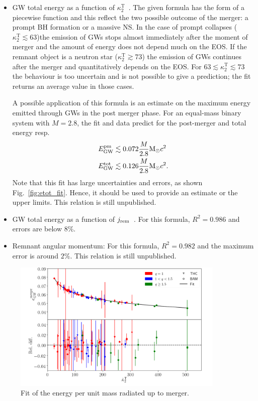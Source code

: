 \documentclass[aps,prl,onecolumn,superscriptaddress,groupedaddress,nofootinbib,floatfix,notitlepage]{revtex4-1}
\newcommand{\stext}[1]{\text{#1}}
\def\Msun{{\rm M_{\odot}}}
\begin{document}
\begin{itemize}
\item GW total energy as a function of $\kappa^\text{T}_2$~\cite{Zappa:2017xba}. The given formula has the form of a piecewise function 
  and this reflect the two possible outcome of the merger: a prompt BH
  formation or a massive NS. 
  In the case of prompt collapses ($\kappa_2^\stext{T} \lesssim 63 $)the emission of GWs stops almost immediately
  after the moment of merger and the amount of energy does not depend much on the EOS. If the remnant object is a neutron star ($\kappa_2^\stext{T} \gtrsim 73 $) the 
  emission of GWs continues after the merger and quantitatively
  depends on the EOS. For $63 \lesssim \kappa_2^\stext{T} \lesssim 73$ the
  behaviour is too uncertain  and is not possible to give a prediction; the fit returns an average value in those cases.

  A possible application of this formula is an estimate on the maximum energy emitted through GWs in the post merger phase. For an equal-mass binary system with $M = 2.8$,
  the fit and data predict for the post-merger and total energy resp.
  \begin{align}
  E_\stext{GW}^\stext{pm} &\lesssim 0.072 \frac{M}{2.8} \Msun c^2 \\
  E_\stext{GW}^\stext{tot} &\lesssim 0.126 \frac{M}{2.8} \Msun c^2.
  \end{align}
  Note that this fit has large uncertainties and errors, as shown Fig.~\ref{fig:etot_fit}. Hence, it should be used to provide an estimate or the upper limits. This relation is still unpublished.
  
\item GW total energy as a function of $j_{\rm rem}$~\cite{Zappa:2017xba}. For this formula, $R^2 = 0.986$ and errors are below 
$8\%$.

\item Remnant angular momentum: For this formula, $R^2 = 0.982$ and the maximum error is around $2\%$. This relation is 
  still unpublished.
  
\end{itemize}

\begin{figure}[t]
  \centering 
  \includegraphics[width=0.9\textwidth]{egw_mrg_fit.png}
  \caption{Fit of the energy per unit mass radiated up to merger.}
  \label{fig:emrg_fit}
\end{figure}
\end{document}
